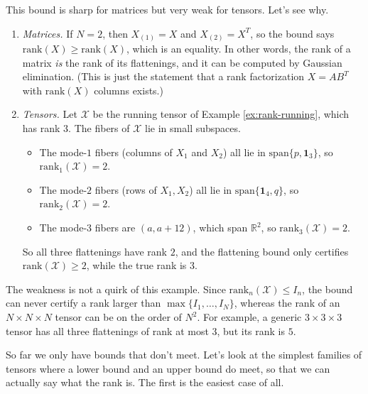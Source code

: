     This bound is sharp for matrices but very weak for tensors. Let's see why. 

    \begin{example}
      \label{ex:flattening-sharp-weak}
      \begin{enumerate}
        \item \textit{Matrices.} If $N = 2$, then $X_{(1)} = X$ and $X_{(2)} = X^T$, so the bound says $\mathrm{rank}(X) \geq \mathrm{rank}(X)$, which is an equality. In other words, the rank of a matrix \textit{is} the rank of its flattenings, and it can be computed by Gaussian elimination. (This is just the statement that a rank factorization $X = A B^T$ with $\mathrm{rank}(X)$ columns exists.) 

        \item \textit{Tensors.} Let $\mathcal{X}$ be the running tensor of Example \ref{ex:rank-running}, which has rank $3$. The fibers of $\mathcal{X}$ lie in small subspaces. 
        \begin{itemize}
          \item The mode-$1$ fibers (columns of $X_1$ and $X_2$) all lie in $\mathrm{span}\{p, \mathbf{1}_3\}$, so $\mathrm{rank}_1(\mathcal{X}) = 2$. 
          \item The mode-$2$ fibers (rows of $X_1, X_2$) all lie in $\mathrm{span}\{\mathbf{1}_4, q\}$, so $\mathrm{rank}_2(\mathcal{X}) = 2$. 
          \item The mode-$3$ fibers are $(a, a + 12)$, which span $\mathbb{R}^2$, so $\mathrm{rank}_3(\mathcal{X}) = 2$. 
        \end{itemize}
        So all three flattenings have rank $2$, and the flattening bound only certifies $\mathrm{rank}(\mathcal{X}) \geq 2$, while the true rank is $3$. 
      \end{enumerate}
      The weakness is not a quirk of this example. Since $\mathrm{rank}_n(\mathcal{X}) \leq I_n$, the bound can never certify a rank larger than $\max\{I_1, \ldots, I_N\}$, whereas the rank of an $N \times N \times N$ tensor can be on the order of $N^2$. For example, a generic $3 \times 3 \times 3$ tensor has all three flattenings of rank at most $3$, but its rank is $5$. 
    \end{example}

    So far we only have bounds that don't meet. Let's look at the simplest families of tensors where a lower bound and an upper bound do meet, so that we can actually say what the rank is. The first is the easiest case of all. 

